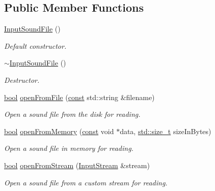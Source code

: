 \subsection*{Public Member Functions}
\begin{DoxyCompactItemize}
\item 
\hyperlink{classsf_1_1_input_sound_file_a3b95347de25d1d93a3230287cf47a077}{Input\-Sound\-File} ()
\begin{DoxyCompactList}\small\item\em Default constructor. \end{DoxyCompactList}\item 
\hyperlink{classsf_1_1_input_sound_file_a326a1a486587038123de0c187bf5c635}{$\sim$\-Input\-Sound\-File} ()
\begin{DoxyCompactList}\small\item\em Destructor. \end{DoxyCompactList}\item 
\hyperlink{term__entry_8h_a002004ba5d663f149f6c38064926abac}{bool} \hyperlink{classsf_1_1_input_sound_file_af68e54bc9bfac19554c84601156fe93f}{open\-From\-File} (\hyperlink{term__entry_8h_a57bd63ce7f9a353488880e3de6692d5a}{const} std\-::string \&filename)
\begin{DoxyCompactList}\small\item\em Open a sound file from the disk for reading. \end{DoxyCompactList}\item 
\hyperlink{term__entry_8h_a002004ba5d663f149f6c38064926abac}{bool} \hyperlink{classsf_1_1_input_sound_file_a4e034a8e9e69ca3c33a3f11180250400}{open\-From\-Memory} (\hyperlink{term__entry_8h_a57bd63ce7f9a353488880e3de6692d5a}{const} void $\ast$data, \hyperlink{nc__alloc_8h_a7b60c5629e55e8ec87a4547dd4abced4}{std\-::size\-\_\-t} size\-In\-Bytes)
\begin{DoxyCompactList}\small\item\em Open a sound file in memory for reading. \end{DoxyCompactList}\item 
\hyperlink{term__entry_8h_a002004ba5d663f149f6c38064926abac}{bool} \hyperlink{classsf_1_1_input_sound_file_a32b76497aeb088a2b46dc6efd819b909}{open\-From\-Stream} (\hyperlink{classsf_1_1_input_stream}{Input\-Stream} \&stream)
\begin{DoxyCompactList}\small\item\em Open a sound file from a custom stream for reading. \end{DoxyCompactList}\item 

\end{DoxyCompactItemize}
